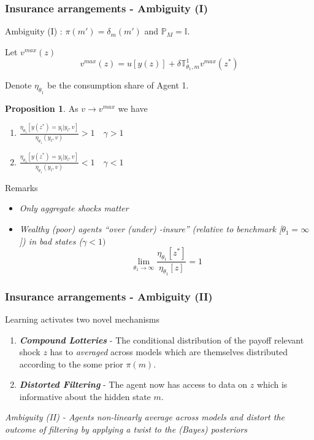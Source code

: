 \documentclass{beamer}
\theoremstyle{definition}
\newtheorem{proposition}{Proposition}%
\begin{document}
\begin{frame}
\frametitle{Insurance arrangements - Ambiguity (I)}
Ambiguity (I) :  $\pi(m')=\delta_{m}(m')$ and $\mathbb{P}_M=\mathbb{I}$.

Let $v^{max}(z)$
\[v^{max}(z)=u[y(z)]+\delta \mathbb{T}^1_{\theta_1,m}v^{max}(z^*)\]

\small{Denote $\eta_{\theta_1}$ be the consumption share of Agent 1. }


\begin{proposition}
As $v\to v^{max}$ we have 
\begin{enumerate}
	\item $\frac{\eta_{\theta_1}[y(z^*)=y_l | y_l,v]}{\eta_{\theta_1}(y_l,v)} > 1 \quad \gamma >1$
	\item  $\frac{\eta_{\theta_1}[y(z^*)=y_l | y_l,v]}{\eta_{\theta_1}(y_l,v)} < 1 \quad \gamma < 1$
\end{enumerate}
\end{proposition}

Remarks
\begin{itemize}
	\item \emph{Only aggregate shocks matter}
	\item \emph{Wealthy (poor) agents ``over (under) -insure'' (relative to benchmark [$\theta_1=\infty$]) in bad states ($\gamma <1)$ }
\[\lim_{\theta_1 \to \infty} \frac{\eta_{\theta_1}[z^*]}{\eta_{\theta_1}[z]}=1\]
\end{itemize}
\end{frame}


\begin{frame}
\frametitle{Insurance arrangements - Ambiguity (II)}

Learning activates two novel mechanisms
\begin{enumerate}
\item \textbf{\emph{Compound Lotteries}}  -  The conditional distribution of the payoff relevant shock $z$  has to \emph{averaged} across models which are themselves distributed according to the some prior $\pi(m)$.

\item \textbf{\emph{Distorted Filtering }} - The agent now has access to data on $z$ which is informative about the hidden state $m$.
\end{enumerate}

\emph{Ambiguity (II) - Agents \emph{non-linearly} average across models and distort the outcome of filtering by applying a twist to the (Bayes) posteriors}
\end{frame}
\end{document}
